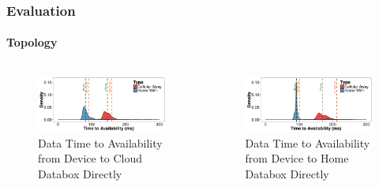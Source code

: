 \documentclass[aspectratio=169]{beamer}
\begin{document}
\begin{frame}
	\frametitle{Evaluation}
	\framesubtitle{Topology}

	\begin{columns}[c]
		\begin{figure}
			\centering
			\includegraphics[width=\columnwidth]{acc-inout-cloud}
			\caption{Data Time to Availability from Device to Cloud Databox Directly}
		\end{figure}
		\begin{figure}
			\centering
			\includegraphics[width=\columnwidth]{acc-inout-home}
			\caption{Data Time to Availability from Device to Home Databox Directly}
		\end{figure}
	\end{columns}
	\centering
\end{frame}
\end{document}
